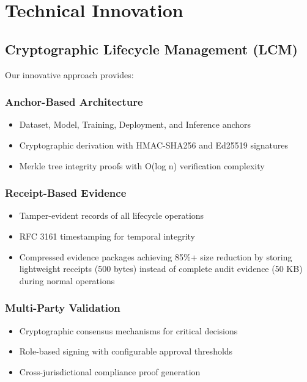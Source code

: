 \documentclass[12pt,a4paper]{article}
\begin{document}
\section{Technical Innovation}

\subsection{Cryptographic Lifecycle Management (LCM)}

Our innovative approach provides:

\subsubsection{Anchor-Based Architecture}
\begin{itemize}
    \item Dataset, Model, Training, Deployment, and Inference anchors
    \item Cryptographic derivation with HMAC-SHA256 and Ed25519 signatures
    \item Merkle tree integrity proofs with O(log n) verification complexity
\end{itemize}

\subsubsection{Receipt-Based Evidence}
\begin{itemize}
    \item Tamper-evident records of all lifecycle operations
    \item RFC 3161 timestamping for temporal integrity
    \item Compressed evidence packages achieving 85\%+ size reduction by storing lightweight receipts (500 bytes) instead of complete audit evidence (50 KB) during normal operations
\end{itemize}

\subsubsection{Multi-Party Validation}
\begin{itemize}
    \item Cryptographic consensus mechanisms for critical decisions
    \item Role-based signing with configurable approval thresholds
    \item Cross-jurisdictional compliance proof generation
\end{itemize}
\end{document}
